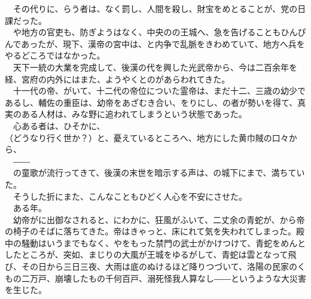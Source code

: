 \documentclass[
  paper=a5,
  fontsize=10pt,
  jafontsize=9.5pt,
  tate,                  %
  open_bracket_pos=nibu, %
]{jlreq}
\begin{document}
　その代りに、らう者は、なく罰し、人間を殺し、財宝をめとることが、党の日課だった。\\


　や地方の官吏も、防ぎようはなく、中央のの王城へ、急を告げることもひんぴんであったが、現下、漢帝の宮中は、と内争で乱脈をきわめていて、地方へ兵をやるどころではなかった。\\


　天下一統の大業を完成して、後漢の代を興した光武帝から、今は二百余年を経、宮府の内外にはまた、ようやくとのがあらわれてきた。\\


　十一代の帝、がいて、十二代の帝位についた霊帝は、まだ十二、三歳の幼少であるし、輔佐の重臣は、幼帝をあざむき合い、をりにし、の者が勢いを得て、真実のある人材は、みな野に追われてしまうという状態であった。\\


　心ある者は、ひそかに、\\


（どうなり行く世か？）と、憂えているところへ、地方にした黄巾賊の口々から、\\


　――\\


　の童歌が流行ってきて、後漢の末世を暗示する声は、の城下にまで、満ちていた。\\


　そうした折にまた、こんなこともひどく人心を不安にさせた。\\


　ある年。\\


　幼帝がに出御なされると、にわかに、狂風がふいて、二丈余の青蛇が、から帝の椅子のそばに落ちてきた。帝はきゃっと、床にれて気を失われてしまった。殿中の騒動はいうまでもなく、やをもった禁門の武士がかけつけて、青蛇をめんとしたところが、突如、まじりの大風が王城をゆるがして、青蛇は雲となって飛び、その日から三日三夜、大雨は底のぬけるほど降りつづいて、洛陽の民家のくもの二万戸、崩壊したもの千何百戸、溺死怪我人算なし――というような大災害を生じた。\\
\end{document}
